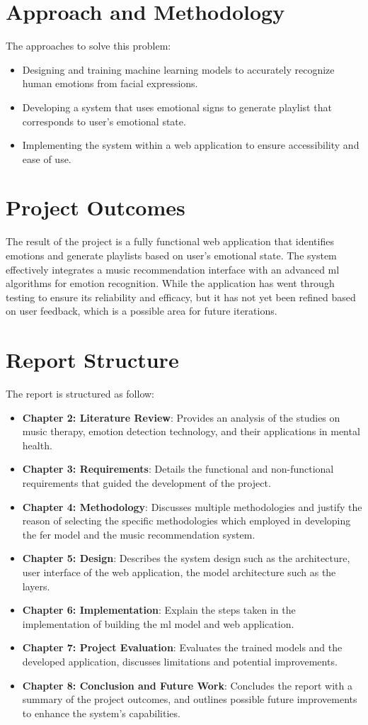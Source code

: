 \section{Approach and Methodology}
The approaches to solve this problem:
\begin{itemize}
    \item Designing and training machine learning models to accurately recognize human emotions from facial expressions.
    \item Developing a system that uses emotional signs to generate playlist that corresponds to user's emotional state.
    \item Implementing the system within a web application to ensure accessibility and ease of use.
\end{itemize}

\section{Project Outcomes}
The result of the project is a fully functional web  application that identifies emotions and generate playlists based on user's emotional state.
The system effectively integrates a music recommendation interface with an advanced \gls{ml} algorithms for emotion recognition.
While the application has went through testing to ensure its reliability and efficacy, but it has not yet been refined based on user feedback, which is a possible area for future iterations.

\section{Report Structure}
The report is structured as follow:
\begin{itemize}
    \item \textbf{Chapter 2: Literature Review}: Provides an analysis of the studies on music therapy, emotion detection technology, and their applications in mental health.
    \item \textbf{Chapter 3: Requirements}: Details the functional and non-functional requirements that guided the development of the project.
    \item \textbf{Chapter 4: Methodology}: Discusses multiple methodologies and justify the reason of selecting the specific methodologies which employed in developing the \gls{fer} model and the music recommendation system.
    \item \textbf{Chapter 5: Design}: Describes the system design such as the architecture, user interface of the web application, the model architecture such as the layers.
    \item \textbf{Chapter 6: Implementation}: Explain the steps taken in the implementation of building the \gls{ml} model and web application.
    \item \textbf{Chapter 7: Project Evaluation}: Evaluates the trained models and the developed application, discusses limitations and potential improvements.
    \item \textbf{Chapter 8: Conclusion and Future Work}: Concludes the report with a summary of the project outcomes, and outlines possible future improvements to enhance the system's capabilities.
\end{itemize}
